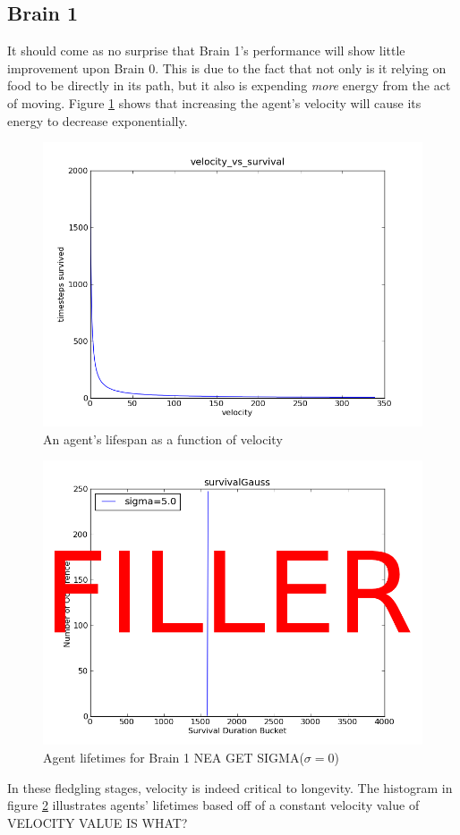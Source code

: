 \subsection{Brain 1}
It should come as no surprise that Brain 1's performance will show
little improvement upon Brain 0. This is due to the fact that not only is
it relying on food to be directly in its path, but it also is expending 
\emph{more} energy from the act of moving. Figure \ref{fig:brain1velo} shows
that increasing the agent's velocity will cause its energy to decrease
exponentially.

\begin{figure}
\begin{center}
  \includegraphics[scale=.65]{plots/brain1velo.png}
  \caption{An agent's lifespan as a function of velocity}
  \label{fig:brain1velo}
\end{center}
\end{figure}

\begin{figure}
\begin{center}
  \includegraphics[scale=.65]{plots/filler.png}
  \caption{Agent lifetimes for Brain 1 {\Large NEA GET SIGMA}($\sigma = 0$)}
  \label{fig:brain1his}
\end{center}
\end{figure}

In these fledgling stages, velocity is indeed critical to longevity. The
histogram in figure \ref{fig:brain1his} illustrates agents' lifetimes based
off of a constant velocity value of {\Large VELOCITY VALUE IS WHAT?}
